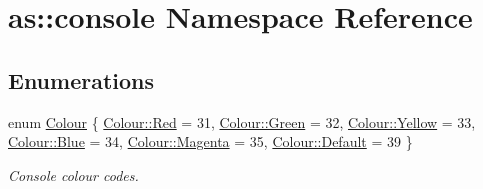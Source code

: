 \hypertarget{namespaceas_1_1console}{}\section{as\+:\+:console Namespace Reference}
\label{namespaceas_1_1console}
\subsection*{Enumerations}
\begin{DoxyCompactItemize}
\item 
enum \hyperlink{namespaceas_1_1console_ab2f5a531e43f4ee9e0f348f8aa5ce16c}{Colour} \{ \newline
\hyperlink{namespaceas_1_1console_ab2f5a531e43f4ee9e0f348f8aa5ce16caee38e4d5dd68c4e440825018d549cb47}{Colour\+::\+Red} = 31, 
\hyperlink{namespaceas_1_1console_ab2f5a531e43f4ee9e0f348f8aa5ce16cad382816a3cbeed082c9e216e7392eed1}{Colour\+::\+Green} = 32, 
\hyperlink{namespaceas_1_1console_ab2f5a531e43f4ee9e0f348f8aa5ce16ca51e6cd92b6c45f9affdc158ecca2b8b8}{Colour\+::\+Yellow} = 33, 
\hyperlink{namespaceas_1_1console_ab2f5a531e43f4ee9e0f348f8aa5ce16ca9594eec95be70e7b1710f730fdda33d9}{Colour\+::\+Blue} = 34, 
\newline
\hyperlink{namespaceas_1_1console_ab2f5a531e43f4ee9e0f348f8aa5ce16cab91cc2c1416fcca942b61c7ac5b1a9ac}{Colour\+::\+Magenta} = 35, 
\hyperlink{namespaceas_1_1console_ab2f5a531e43f4ee9e0f348f8aa5ce16ca7a1920d61156abc05a60135aefe8bc67}{Colour\+::\+Default} = 39
 \}\begin{DoxyCompactList}\small\item\em Console colour codes. \end{DoxyCompactList}
\end{DoxyCompactItemize}
